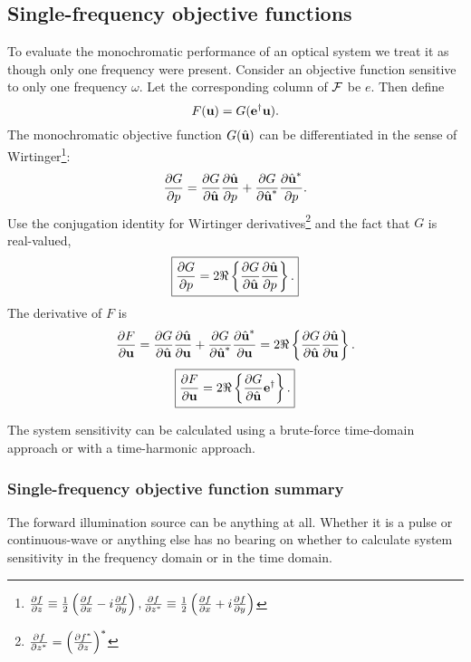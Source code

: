 \subsection{Single-frequency objective functions}

To evaluate the monochromatic performance of an optical system we treat it as though only one frequency were present.  Consider an objective function sensitive to only one frequency $\omega$.  Let the corresponding column of $\mathcal{F}$ be $e$.  Then define
%
\begin{equation}
F(\textbf{u}) = G(\textbf{e}^\dagger \textbf{u}).
\end{equation}
%
The monochromatic objective function $G(\hat{\textbf{u}})$ can be differentiated in the sense of Wirtinger\footnote{$\frac{\partial{f}}{\partial{z}} \equiv \frac{1}{2}\left( \frac{\partial{f}}{\partial{x}} - i \frac{\partial{f}}{\partial{y}}\right), \frac{\partial{f}}{\partial{z^\ast}} \equiv \frac{1}{2} \left( \frac{\partial{f}}{\partial{x}} + i \frac{\partial{f}}{\partial{y}} \right)$}:
%
\begin{equation}
\frac{\partial{G}}{\partial{p}} = \frac{\partial{G}}{\partial{\hat{\textbf{u}}}} \frac{\partial{\hat{\textbf{u}}}}{\partial{p}} + \frac{\partial{G}}{\partial{\hat{\textbf{u}}^\ast}} \frac{\partial{\hat{\textbf{u}}^\ast}}{\partial{p}}.
\end{equation}
%
Use the conjugation identity for Wirtinger derivatives\footnote{$\frac{\partial{f}}{\partial{z^\ast}} = \left( \frac{\partial{f^\ast}}{\partial{z}}\right)^\ast$} and the fact that $G$ is real-valued,
%
\begin{equation}
\boxed{
\pp{G}{p} = 2 \Re \left\{ \pp{G}{\hat{\ve u}} \pp{\hat{\ve u}}{p} \right\}.
}%
\label{eqn:dGdp}
\end{equation}
%
The derivative of $F$ is
%
\begin{equation}
\frac{\partial{F}}{\partial{\textbf{u}}} = \frac{\partial{G}}{\partial{\hat{\textbf{u}}}} \frac{\partial{\hat{\textbf{u}}}}{\partial{\textbf{u}}} + \frac{\partial{G}}{\partial{\hat{\textbf{u}}^\ast}} \frac{\partial{\hat{\textbf{u}}^\ast}}{\partial{\textbf{u}}} = 2 \Re \left\{ \frac{\partial{G}}{\partial{\hat{\textbf{u}}}} \frac{\partial{\hat{\textbf{u}}}}{\partial{\textbf{u}}} \right\}.
\end{equation}
%
\begin{equation}
\boxed{
\pp{F}{\ve u} = 2 \Re \left\{ \pp{G}{\hat{\ve u}} \ve{e}^\dagger \right\}.
}%
\end{equation}

The system sensitivity can be calculated using a brute-force time-domain approach or with a time-harmonic approach.


\subsubsection{Single-frequency objective function summary}

The forward illumination source can be anything at all.  Whether it is a pulse or continuous-wave or anything else has no bearing on whether to calculate system sensitivity in the frequency domain or in the time domain.

